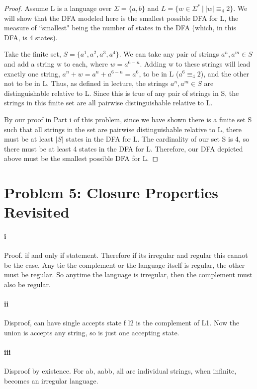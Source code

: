 \documentclass[10pt,letter]{article}
\begin{document}
\begin{proof} Assume L is a language over $\Sigma = \{a,b\}$ and $L=\{w \in \Sigma^*\ |\ |w| \equiv_4 2\}$. We will show that the DFA modeled here is the smallest possible DFA for L, the measure of ``smallest" being the number of states in the DFA (which, in this DFA, is 4 states). 

Take the finite set, $S = \{a^1, a^2, a^3, a^4\}$. We can take any pair of strings $a^n, a^m \in S$ and add a string w to each, where $w = a^{6-n}$. Adding w to these strings will lead exactly one string, $a^n + w = a^n+a^{6-n} = a^6$, to be in L ($a^6 \equiv_4 2$), and the other not to be in L. Thus, as defined in lecture, the strings $a^n, a^m \in S$ are distinguishable relative to L. Since this is true of any pair of strings in S, the strings in this finite set are all pairwise distinguishable relative to L.

By our proof in Part i of this problem, since we have shown there is a finite set S such that all strings in the set are pairwise distinguishable relative to L, there must be at least $|S|$ states in the DFA for L. The cardinality of our set S is 4, so there must be at least 4 states in the DFA for L. Therefore, our DFA depicted above must be the smallest possible DFA for L. 
\end{proof}

\section*{Problem 5: Closure Properties Revisited}
\paragraph{i}
Proof. if and only if statement. Therefore if its irregular and regular this cannot be the case. Any tie the complement or the language itself is regular, the other must be regular. So anytime the language is irregular, then the complement must also be regular. 

\paragraph{ii}
Disproof, can have single accepts state f l2 is the complement of L1. Now the union is accepts any string, so is just one accepting state. 

\paragraph{iii}
Disproof by existence. For ab, aabb, all are individual strings, when infinite, becomes an irregular language. 
\end{document}
